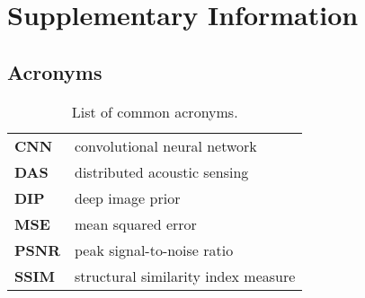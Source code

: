 \chapter{Supplementary Information}

\section{Acronyms}

\begin{table}[h!]
    \centering
    \begin{tabular}{ l l }
        \toprule
        \textbf{CNN} & convolutional neural network \\
        \textbf{DAS} & distributed acoustic sensing \\
        \textbf{DIP} & deep image prior \\
        \textbf{MSE} & mean squared error \\
        \textbf{PSNR} & peak signal-to-noise ratio \\
        \textbf{SSIM} & structural similarity index measure \\
        \bottomrule
    \end{tabular}
    \caption{List of common acronyms.}
\end{table}
